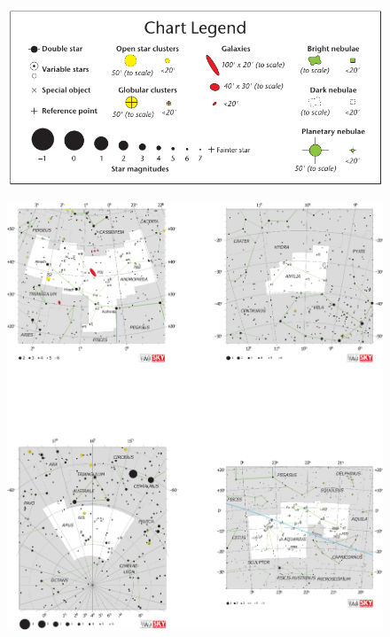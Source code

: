 \documentclass[a4paper,12pt]{extarticle}
\begin{document}
\begin{figure}[H]
    \centering
    \includegraphics[width=0.7\linewidth]{chart_legend.pdf}
\end{figure}
\clearpage
\begin{figure}
    \centering
    \includegraphics[width=\linewidth]{C1.eps}
\end{figure}
\clearpage
\end{document}
